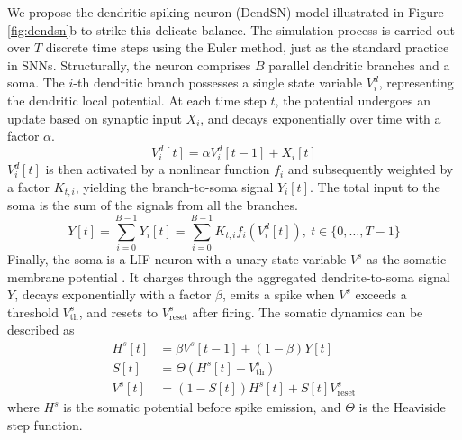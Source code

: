 We propose the dendritic spiking neuron (DendSN) model illustrated in Figure \ref{fig:dendsn}b to strike this delicate balance. The simulation process is carried out over $T$ discrete time steps using the Euler method, just as the standard practice in SNNs. Structurally, the neuron comprises $B$ parallel dendritic branches and a soma. The $i$-th dendritic branch possesses a single state variable $V_i^d$, representing the dendritic local potential. At each time step $t$, the potential undergoes an update based on synaptic input $X_i$, and decays exponentially over time with a factor $\alpha$. 
\begin{equation}\label{eq:results-dend}
    V_i^d[t] = \alpha V_i^d[t-1] + X_i[t]
\end{equation}
$V_i^d[t]$ is then activated by a nonlinear function $f_i$  and subsequently weighted by a factor $K_{t,i}$, yielding the branch-to-soma signal $Y_i[t]$. The total input to the soma is the sum of the signals from all the branches. 
\begin{equation}\label{eq:results-dend2soma}
    Y[t] = \sum_{i=0}^{B-1}Y_i[t] = \sum_{i=0}^{B-1} K_{t,i} f_i(V_i^d[t]), \ t \in \{0,\dots,T-1\}
\end{equation}
Finally, the soma is a LIF neuron with a unary state variable $V^s$ as the somatic membrane potential \cite{lapicque1907lif}. It charges through the aggregated dendrite-to-soma signal $Y$, decays exponentially with a factor $\beta$, emits a spike when $V^s$ exceeds a threshold $V_{\mathrm{th}}^s$, and resets to $V^{s}_{\mathrm{reset}}$ after firing. The somatic dynamics can be described as
\begin{equation}\label{eq:results-LIFsoma}
    \begin{aligned}
        H^s[t] &= \beta V^s[t-1] + (1-\beta)Y[t] \\ 
        S[t] &= \Theta(H^s[t] - V^s_{\mathrm{th}}) \\
        V^s[t] &= (1 - S[t])H^s[t] + S[t]V^s_{\mathrm{reset}}
    \end{aligned}
\end{equation}
where $H^s$ is the somatic potential before spike emission, and $\Theta$ is the Heaviside step function.

